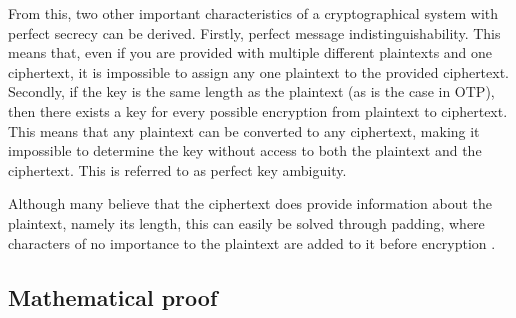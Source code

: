 \documentclass[12pt]{report}
\begin{document}
From this, two other important characteristics of a cryptographical system with perfect secrecy can be derived. Firstly, perfect message indistinguishability. This means that, even if you are provided with multiple different plaintexts and one ciphertext, it is impossible to assign any one plaintext to the provided ciphertext. Secondly, if the key is the same length as the plaintext (as is the case in OTP), then there exists a key for every possible encryption from plaintext to ciphertext. This means that any plaintext can be converted to any ciphertext, making it impossible to determine the key without access to both the plaintext and the ciphertext. This is referred to as perfect key ambiguity.		%

Although many believe that the ciphertext does provide information about the plaintext, namely its length, this can easily be solved through padding, where characters of no importance to the plaintext are added to it before encryption \cite{HutSix}.

\subsection{Mathematical proof}




\end{document}

